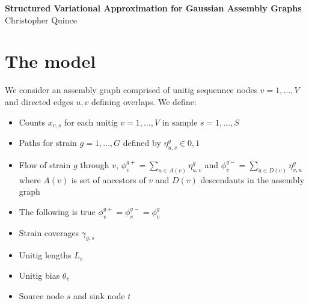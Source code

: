 \documentclass[10pt]{article}
\date{}
\newcommand\titlestring{Structured Variational Approximation for Gaussian Assembly Graphs}
\newcommand\authorstring{Christopher Quince}
\begin{document}
\begin{flushleft}
  {\Large
    \textbf{\titlestring}
  }
\\
\authorstring
\end{flushleft}

\section{The model}

We consider an assembly graph comprised of unitig sequennce nodes $v = 1,\ldots,V$  and directed edges 
${u,v}$ defining overlaps. We define: 
\begin{itemize}

\item Counts $x_{v,s}$ for each unitig $v = 1,\ldots,V$ in sample $s = 1,\ldots,S$

\item Paths for strain $g = 1,\ldots,G$ defined by $\eta^g_{u,v} \in {0,1}$

\item Flow of strain $g$ through $v$, $\phi^{g+}_v = \sum_{u \in A(v)} \eta^g_{u,v}$ 
and $\phi^{g-}_v = \sum_{u \in D(v)} \eta^g_{v,u}$ where $A(v)$ is set of ancestors of $v$ 
and $D(v)$ descendants in the assembly graph

\item The following is true  $\phi^{g+}_v =  \phi^{g-}_v = \phi^{g}_v$

\item Strain coverages $\gamma_{g,s}$

\item Unitig lengths $L_v$

\item Unitig bias $\theta_v$

\item Source node $s$ and sink node $t$

\end{itemize}
\end{document}
